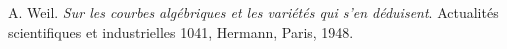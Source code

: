  A. Weil. \emph{Sur les courbes alg\'ebriques et les vari\'et\'es qui s'en d\'eduisent}. Actualit\'es scientifiques et industrielles 1041, Hermann, Paris, 1948. %
